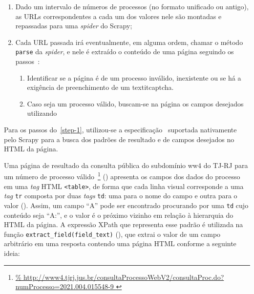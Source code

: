 \begin{enumerate}
    \item Dado um intervalo de números de processos (no formato unificado ou
        antigo), as URLs correspondentes a cada um dos valores nele são
        montadas e repassadas para uma \textit{spider} do Scrapy;
    \item Cada URL passada irá eventualmente, em alguma ordem, chamar o método
        \texttt{parse} da \textit{spider}, e nele é extraído o conteúdo de uma
        página seguindo os passos~\label{step-1}:

        \begin{enumerate}
            \item Identificar se a página é de um processo inválido,
                inexistente ou se há a exigência de preenchimento de um
                textit{captcha}.
            \item Caso seja um processo válido, buscam-se na página os campos
                desejados utilizando
        \end{enumerate}
\end{enumerate}

Para os passos do~\cref{step-1}, utilizou-se a especificação~\cite{spec:xpath}
suportada nativamente pelo Scrapy para a busca dos padrões de resultado e de
campos desejados no HTML da página.


\newcommand{\urlProcValido}{\url{%
    http://www4.tjrj.jus.br/consultaProcessoWebV2/consultaProc.do?numProcesso=2021.004.015548-9
}}

Uma página de resultado da consulta pública do subdomínio ww4 do TJ-RJ para um
número de processo válido~\footnote{\urlProcValido}
() apresenta os campos dos dados do processo em
uma \textit{tag} HTML \texttt{<table>}, de forma que cada linha visual
corresponde a uma \textit{tag} \texttt{tr} composta por duas \textit{tags}
\texttt{td}: uma para o nome do campo e outra para o valor
(). Assim, um campo ``A'' pode ser encontrado procurando
por uma \texttt{td} cujo conteúdo seja ``A:'', e o valor é o próximo vizinho em
relação à hierarquia do HTML da página. A expressão XPath que representa esse
padrão é utilizada na função \texttt{extract_field(field_text)}
(), que extrai o valor de um campo arbitrário em uma
resposta contendo uma página HTML conforme a seguinte ideia:

